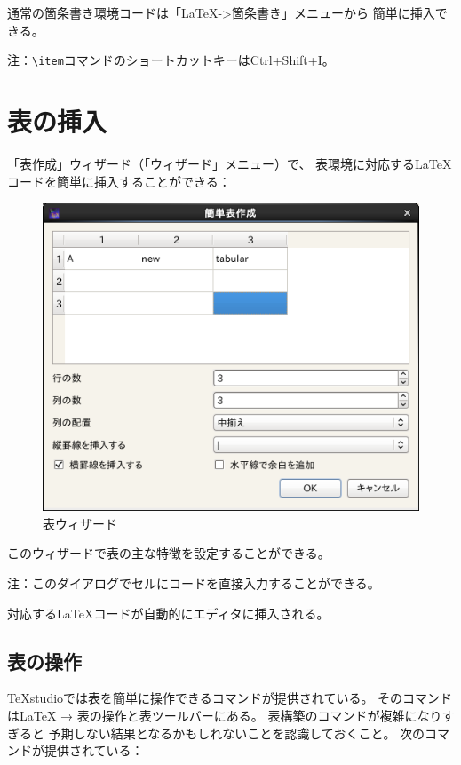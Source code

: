 通常の箇条書き環境コードは「LaTeX-\textgreater{}箇条書き」メニューから
簡単に挿入できる。

注：\verb+\item+コマンドのショートカットキーはCtrl+Shift+I。

\section{表の挿入}

「表作成」ウィザード（「ウィザード」メニュー）で、
表環境に対応するLaTeXコードを簡単に挿入することができる：

\begin{figure}[htbp]
  \centering
  \includegraphics{doc7.png}
  \caption{表ウィザード}
\end{figure}

このウィザードで表の主な特徴を設定することができる。

注：このダイアログでセルにコードを直接入力することができる。

対応するLaTeXコードが自動的にエディタに挿入される。

\subsection{表の操作}

TeXstudioでは表を簡単に操作できるコマンドが提供されている。
そのコマンドはLaTeX → 表の操作と表ツールバーにある。
表構築のコマンドが複雑になりすぎると
予期しない結果となるかもしれないことを認識しておくこと。
次のコマンドが提供されている：

